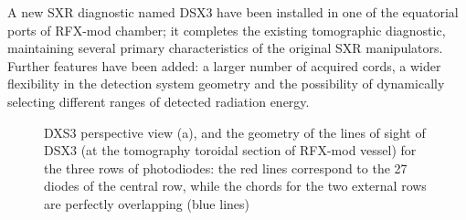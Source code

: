 A new SXR diagnostic named DSX3 have been installed in one of the equatorial ports of RFX-mod chamber; it completes the existing tomographic diagnostic, maintaining several primary characteristics of the original SXR manipulators. Further
features have been added: a larger number of acquired cords, a wider flexibility in the detection system geometry and the possibility of dynamically selecting different ranges of detected radiation energy.
%
\begin{figure}
    \centering
    \caption{DXS3 perspective view (a), and the geometry of the lines of sight of DSX3 (at the tomography toroidal section
             of RFX-mod vessel) for the three rows of photodiodes: the red lines correspond to the
             27 diodes of the central row, while the chords for the two external rows are perfectly
             overlapping (blue lines) }
    \label{fig:DSX3_sketch}
\end{figure}




